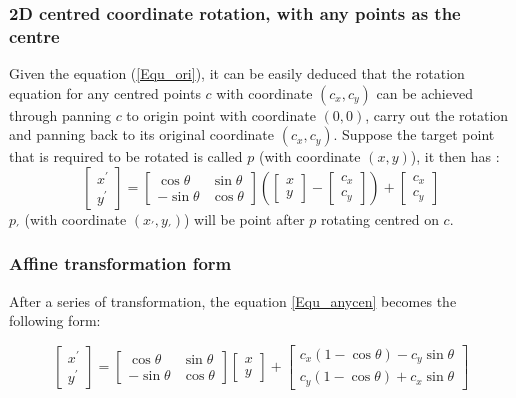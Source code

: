 \subsubsection{2D centred coordinate rotation, with any points as the centre}
Given the equation (\ref{Equ_ori}), it can be easily
deduced that the rotation equation for any centred points $c$ with coordinate $(c_{x}, c_{y})$ can be achieved through
panning $c$ to origin point with coordinate $(0, 0)$, carry out the rotation and panning back to its original coordinate $(c_{x}, c_{y})$.
Suppose the target point that is required to be rotated is called $p$ (with coordinate $(x, y)$), it then has :
\begin{equation} \label{Equ_anycen}
  \begin{bmatrix}
   x^{'} \\ y^{'}
   \end{bmatrix} =   \begin{bmatrix}
      \cos\theta & \sin\theta \\
      -\sin\theta & \cos\theta
    \end{bmatrix} \left(\begin{bmatrix}
      x \\ y
     \end{bmatrix} - \begin{bmatrix}
       c_{x} \\ c_{y}
     \end{bmatrix}\right) + \begin{bmatrix}
        c_{x} \\ c_{y}
       \end{bmatrix}
\end{equation}
$p_{'}$ (with coordinate $(x_{'}, y_{'})$) will be point after $p$ rotating centred on $c$.
\subsubsection{Affine transformation form}
After a series of transformation, the equation \ref{Equ_anycen} becomes the following form:

\begin{equation} \label{Equ_aff}
  \begin{bmatrix}
   x^{'} \\ y^{'}
   \end{bmatrix}  = \begin{bmatrix} \cos\theta & \sin\theta \\ -\sin\theta & \cos\theta \end{bmatrix} \begin{bmatrix} x \\ y \end{bmatrix}
+ \begin{bmatrix} c_{x}(1 - \cos\theta) - c_{y}\sin\theta \\ c_{y}(1 - \cos\theta) + c_{x}\sin\theta \end{bmatrix}
\end{equation}

